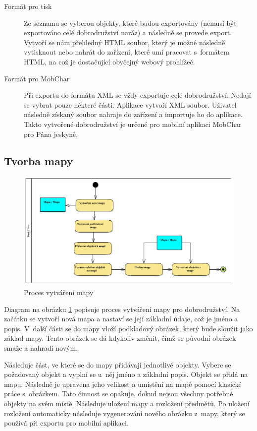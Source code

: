 \documentclass[thesis=B,czech]{resources/FITthesis}[2012/06/26]
\begin{document}
\begin{description}

\item[Formát pro tisk] Ze seznamu se vyberou objekty, které budou exportovány (nemusí být exportováno celé dobrodružství naráz) a následně se provede export. Vytvoří se nám přehledný HTML soubor, který je možné následně vytisknout nebo nahrát do zařízení, které umí pracovat s~formátem HTML, na což je dostačující obyčejný webový prohlížeč.

\item[Formát pro MobChar] Při exportu do formátu XML se vždy exportuje celé dobrodružství. Nedají se vybrat pouze některé části. Aplikace vytvoří XML soubor. Uživatel následně získaný soubor nahraje do zařízení a importuje ho do aplikace. Takto vytvořené dobrodružství je určené pro mobilní aplikaci MobChar pro Pána jeskyně.

\end{description}

\subsection{Tvorba mapy}
\begin{figure}\centering
	\includegraphics[width=1\textwidth]{images/business_mapa}
	\caption[Proces vytváření mapy]{Proces vytváření mapy}\label{fig:bp_mapa}
\end{figure}	
Diagram na obrázku \ref{fig:bp_mapa} popisuje proces vytváření mapy pro dobrodružství. Na začátku se vytvoří nová mapa a nastaví se její základní údaje, což je jméno a popis. V~další části se do mapy vloží podkladový obrázek, který bude sloužit jako základ mapy. Tento obrázek se dá kdykoliv změnit, čímž se původní obrázek smaže a nahradí novým. \par

Následuje část, ve které se do mapy přidávají jednotlivé objekty. Vybere se požadovaný objekt a vyplní se u~něj jméno a základní popis. Objekt se přidá na mapu. Následně je upravena jeho velikost a umístění na mapě pomocí klasické práce s~obrázkem. Tato činnost se opakuje, dokud nejsou všechny potřebné objekty na svém místě. Následuje uložení mapy a rozložení předmětů. Po uložení rozložení automaticky následuje vygenerování nového obrázku z~mapy, který se používá při exportu pro mobilní aplikaci.
\end{document}
